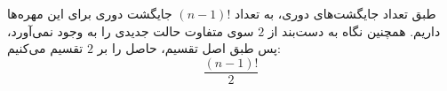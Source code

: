 \p
طبق تعداد جایگشت‌های دوری، به تعداد 
$(n-1)!$
جایگشت دوری برای این مهره‌ها داریم. همچنین نگاه به دست‌بند از
$2$
    سوی متفاوت حالت جدیدی را به وجود نمی‌آورد، پس طبق اصل تقسیم، حاصل را بر 
$2$
    تقسیم می‌کنیم:
$$\frac{(n-1)!}{2}$$